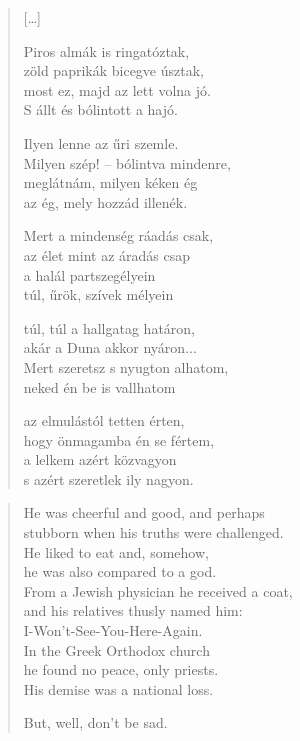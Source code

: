 \documentclass[11pt]{book}
\newcommand*{\centeredornament}{\centerline{\pgfornament[width=6cm]{88}}}
\begin{document}
\begin{verse}
  \textnormal{[\ldots]}

  Piros almák is ringatóztak, \\
  zöld paprikák bicegve úsztak, \\
  most ez, majd az lett volna jó. \\
  S állt és bólintott a hajó.

  Ilyen lenne az űri szemle. \\
  Milyen szép! -- bólintva mindenre, \\
  meglátnám, milyen kéken ég \\
  az ég, mely hozzád illenék.

  Mert a mindenség ráadás csak, \\
  az élet mint az áradás csap \\
  a halál partszegélyein \\
  túl, űrök, szívek mélyein

  túl, túl a hallgatag határon, \\
  akár a Duna akkor nyáron... \\
  Mert szeretsz s nyugton alhatom, \\
  neked én be is vallhatom

  az elmulástól tetten érten, \\
  hogy önmagamba én se fértem, \\
  a lelkem azért közvagyon \\
  s azért szeretlek ily nagyon.
\end{verse}

\newpage

\vspace*{-15mm}
\centeredornament



\begin{verse}
  He was cheerful and good, and perhaps \\
  stubborn when his truths were challenged. \\
  He liked to eat and, somehow, \\
  he was also compared to a god. \\
  From a Jewish physician he received a coat, \\
  and his relatives thusly named him: \\
  I-Won't-See-You-Here-Again. \\
  In the Greek Orthodox church \\
  he found no peace, only priests. \\
  His demise was a national loss.

  But, well, don't be sad.
\end{verse}
\end{document}
